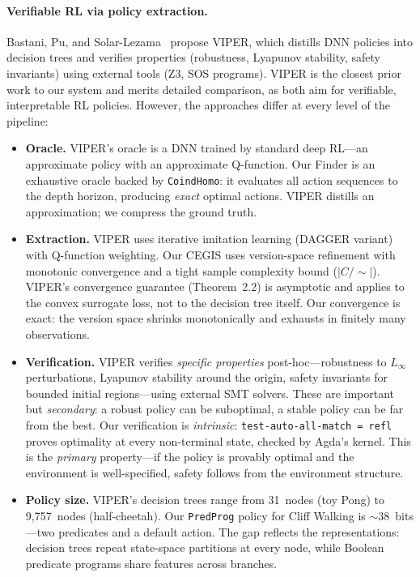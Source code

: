 \documentclass[9pt,a4paper]{article}
\theoremstyle{plain}
\theoremstyle{definition}
\theoremstyle{remark}
\begin{document}
\paragraph{Verifiable RL via policy extraction.}  Bastani, Pu, and Solar-Lezama~\cite{Bastani2018} propose VIPER, which distills DNN policies into decision trees and verifies properties (robustness, Lyapunov stability, safety invariants) using external tools (Z3, SOS programs).  VIPER is the closest prior work to our system and merits detailed comparison, as both aim for verifiable, interpretable RL policies.  However, the approaches differ at every level of the pipeline:

\begin{itemize}
\item \textbf{Oracle.}  VIPER's oracle is a DNN trained by standard deep RL---an approximate policy with an approximate Q-function.  Our Finder is an exhaustive oracle backed by \texttt{CoindHomo}: it evaluates all action sequences to the depth horizon, producing \emph{exact} optimal actions.  VIPER distills an approximation; we compress the ground truth.

\item \textbf{Extraction.}  VIPER uses iterative imitation learning (DAGGER variant) with Q-function weighting.  Our CEGIS uses version-space refinement with monotonic convergence and a tight sample complexity bound ($|C/{\sim}|$).  VIPER's convergence guarantee (Theorem~2.2) is asymptotic and applies to the convex surrogate loss, not to the decision tree itself.  Our convergence is exact: the version space shrinks monotonically and exhausts in finitely many observations.

\item \textbf{Verification.}  VIPER verifies \emph{specific properties} post-hoc---robustness to $L_\infty$ perturbations, Lyapunov stability around the origin, safety invariants for bounded initial regions---using external SMT solvers.  These are important but \emph{secondary}: a robust policy can be suboptimal, a stable policy can be far from the best.  Our verification is \emph{intrinsic}: \texttt{test-auto-all-match = refl} proves optimality at every non-terminal state, checked by Agda's kernel.  This is the \emph{primary} property---if the policy is provably optimal and the environment is well-specified, safety follows from the environment structure.

\item \textbf{Policy size.}  VIPER's decision trees range from 31~nodes (toy Pong) to 9{,}757~nodes (half-cheetah).  Our \texttt{PredProg} policy for Cliff Walking is ${\sim}$38~bits---two predicates and a default action.  The gap reflects the representations: decision trees repeat state-space partitions at every node, while Boolean predicate programs share features across branches.


\end{itemize}
\end{document}
